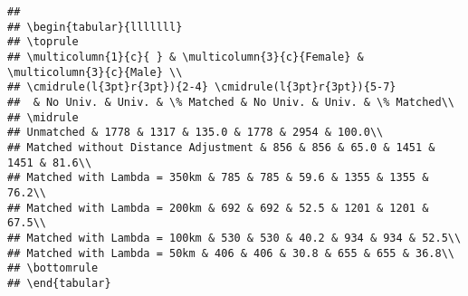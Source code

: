 \documentclass[
]{article}
\begin{document}
\begin{verbatim}
## 
## \begin{tabular}{lllllll}
## \toprule
## \multicolumn{1}{c}{ } & \multicolumn{3}{c}{Female} & \multicolumn{3}{c}{Male} \\
## \cmidrule(l{3pt}r{3pt}){2-4} \cmidrule(l{3pt}r{3pt}){5-7}
##  & No Univ. & Univ. & \% Matched & No Univ. & Univ. & \% Matched\\
## \midrule
## Unmatched & 1778 & 1317 & 135.0 & 1778 & 2954 & 100.0\\
## Matched without Distance Adjustment & 856 & 856 & 65.0 & 1451 & 1451 & 81.6\\
## Matched with Lambda = 350km & 785 & 785 & 59.6 & 1355 & 1355 & 76.2\\
## Matched with Lambda = 200km & 692 & 692 & 52.5 & 1201 & 1201 & 67.5\\
## Matched with Lambda = 100km & 530 & 530 & 40.2 & 934 & 934 & 52.5\\
## Matched with Lambda = 50km & 406 & 406 & 30.8 & 655 & 655 & 36.8\\
## \bottomrule
## \end{tabular}
\end{verbatim}
\end{document}
